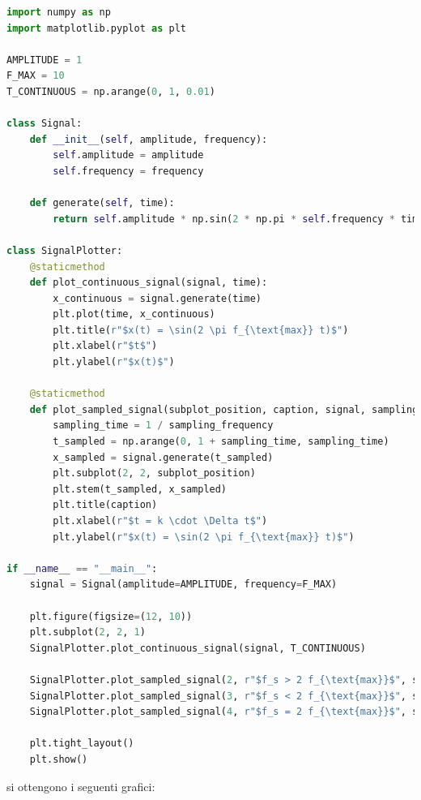 \documentclass[a4paper,12pt]{report}  %
\begin{document}
\begin{lstlisting}[language=Python,keywords={def, self, class, title, @staticmethod, import, as, arange, sin, pi, figure, subplot, plot, if, xlabel, ylabel, stem, tight_layout, show}]
import numpy as np
import matplotlib.pyplot as plt

AMPLITUDE = 1
F_MAX = 10
T_CONTINUOUS = np.arange(0, 1, 0.01)

class Signal:
    def __init__(self, amplitude, frequency):
        self.amplitude = amplitude
        self.frequency = frequency

    def generate(self, time):
        return self.amplitude * np.sin(2 * np.pi * self.frequency * time)

class SignalPlotter:
    @staticmethod
    def plot_continuous_signal(signal, time):
        x_continuous = signal.generate(time)
        plt.plot(time, x_continuous)
        plt.title(r"$x(t) = \sin(2 \pi f_{\text{max}} t)$")
        plt.xlabel(r"$t$")
        plt.ylabel(r"$x(t)$")

    @staticmethod
    def plot_sampled_signal(subplot_position, caption, signal, sampling_frequency):
        sampling_time = 1 / sampling_frequency
        t_sampled = np.arange(0, 1 + sampling_time, sampling_time)
        x_sampled = signal.generate(t_sampled)
        plt.subplot(2, 2, subplot_position)
        plt.stem(t_sampled, x_sampled)
        plt.title(caption)
        plt.xlabel(r"$t = k \cdot \Delta t$")
        plt.ylabel(r"$x(t) = \sin(2 \pi f_{\text{max}} t)$")

if __name__ == "__main__":
    signal = Signal(amplitude=AMPLITUDE, frequency=F_MAX)

    plt.figure(figsize=(12, 10))
    plt.subplot(2, 2, 1)
    SignalPlotter.plot_continuous_signal(signal, T_CONTINUOUS)

    SignalPlotter.plot_sampled_signal(2, r"$f_s > 2 f_{\text{max}}$", signal, sampling_frequency=4 * F_MAX) # f_s > 2 * f_max
    SignalPlotter.plot_sampled_signal(3, r"$f_s < 2 f_{\text{max}}$", signal, sampling_frequency=10)        # f_s < 2 * f_max
    SignalPlotter.plot_sampled_signal(4, r"$f_s = 2 f_{\text{max}}$", signal, sampling_frequency=2 * F_MAX) # f_s = 2 * f_max

    plt.tight_layout()
    plt.show()
\end{lstlisting}

si ottengono i seguenti grafici:
\end{document}

